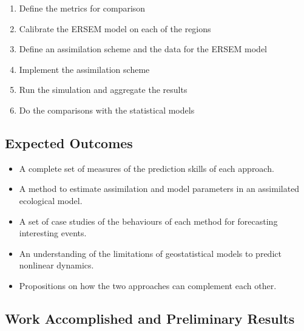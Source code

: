 \begin{enumerate}
\item Define the metrics for comparison
\item Calibrate the ERSEM model on each of the regions
\item Define an assimilation scheme and the data for the ERSEM model
\item Implement the assimilation scheme
\item Run the simulation and aggregate the results
\item Do the comparisons with the statistical models
\end{enumerate}

\subsection{Expected Outcomes}

\begin{itemize}
\item A complete set of measures of the prediction skills of each approach.
\item A method to estimate assimilation and model parameters in an assimilated ecological model.
\item A set of case studies of the behaviours of each method for forecasting interesting events.
\item An understanding of the limitations of geostatistical models to predict nonlinear dynamics. 
\item Propositions on how the two approaches can complement each other.
\end{itemize}

\subsection{Work Accomplished and Preliminary Results}

